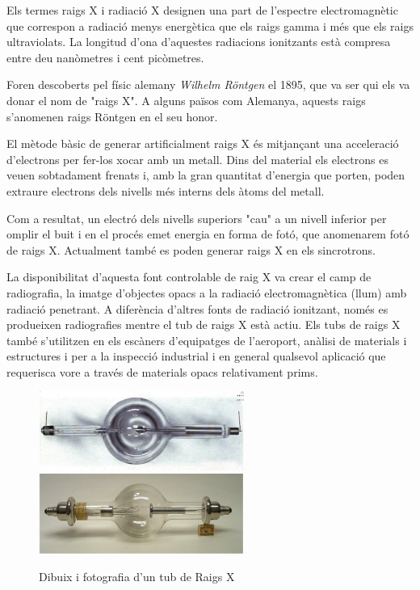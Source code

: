 \documentclass[11pt]{article}
\begin{document}
        Els termes raigs X i radiació X designen una part de l'espectre electromagnètic que correspon a radiació menys energètica que els raigs gamma i més que els raigs ultraviolats. La longitud d'ona d'aquestes radiacions ionitzants està compresa entre deu nanòmetres i cent picòmetres.

        \vspace{0.5cm}Foren descoberts pel físic alemany \textit{Wilhelm Röntgen} el 1895, que va ser qui els va donar el nom de "raigs X". A alguns països com Alemanya, aquests raigs s'anomenen raigs Röntgen en el seu honor.

        \vspace{0.4cm}El mètode bàsic de generar artificialment raigs X és mitjançant una acceleració d'electrons per fer-los xocar amb un metall. Dins del material els electrons es veuen sobtadament frenats i, amb la gran quantitat d'energia que porten, poden extraure electrons dels nivells més interns dels àtoms del metall.

        \vspace{0.4cm}Com a resultat, un electró dels nivells superiors "cau" a un nivell inferior per omplir el buit i en el procés emet energia en forma de fotó, que anomenarem fotó de raigs X. Actualment també es poden generar raigs X en els sincrotrons.

        \vspace{0.4cm}La disponibilitat d'aquesta font controlable de raig X va crear el camp de radiografia, la imatge d'objectes opacs a la radiació electromagnètica (llum) amb radiació penetrant. A diferència d'altres fonts de radiació ionitzant, només es produeixen radiografies mentre el tub de raigs X està actiu. Els tubs de raigs X també s'utilitzen en els escàners d'equipatges de l'aeroport, anàlisi de materials i estructures i per a la inspecció industrial i en general qualsevol aplicació que requerisca vore a través de materials opacs relativament prims.

        \vspace{0.4cm}
        \begin{figure}[h]
            \centering
            \includegraphics[width=0.6\textwidth]{fotos/dibujotubo.jpg}
            \includegraphics[width=0.6\textwidth]{fotos/foto_tubo.png}
            \caption{Dibuix i fotografia d'un tub de Raigs X}
            \label{fig:raigs X}
        \end{figure}
        
\end{document}
